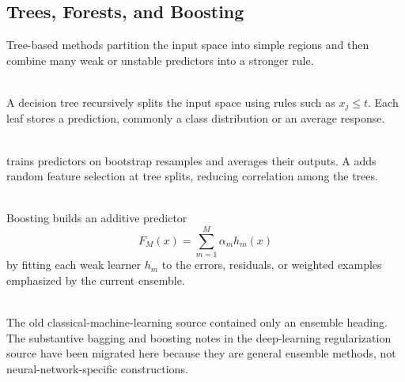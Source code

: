 \subsection{Trees, Forests, and Boosting}

Tree-based methods partition the input space into simple regions and then combine many weak or unstable predictors into a stronger rule.

\begin{definition} \label{def:sl-decision-tree} \\
A decision tree recursively splits the input space using rules such as $x_j\leq t$.  Each leaf stores a prediction, commonly a class distribution or an average response.
\end{definition}

\begin{definition} \label{def:sl-bagging-random-forest} \\
 trains predictors on bootstrap resamples and averages their outputs.  A  adds random feature selection at tree splits, reducing correlation among the trees.
\end{definition}

\begin{definition} \label{def:sl-boosting} \\
Boosting builds an additive predictor
\[
F_M(x)=\sum_{m=1}^M\alpha_m h_m(x)
\]
by fitting each weak learner $h_m$ to the errors, residuals, or weighted examples emphasized by the current ensemble.
\end{definition}

\begin{remark} \label{rem:sl-ensemble-source-migration} \\
The old classical-machine-learning source contained only an ensemble heading.  The substantive bagging and boosting notes in the deep-learning regularization source have been migrated here because they are general ensemble methods, not neural-network-specific constructions.
\end{remark}
